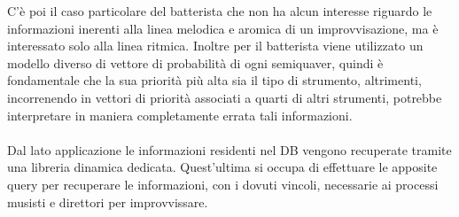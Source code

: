 C'è poi il caso particolare del batterista
che non ha alcun interesse riguardo le informazioni inerenti alla linea melodica 
e aromica di un improvvisazione, ma è interessato solo alla linea ritmica. Inoltre
per il batterista viene utilizzato un modello diverso di vettore di probabilità 
di ogni semiquaver, quindi è fondamentale che la sua priorità più alta sia il tipo 
di strumento, altrimenti, incorrenendo in vettori di priorità associati a quarti di
altri strumenti, potrebbe interpretare in maniera completamente errata tali informazioni.\\\\
Dal lato applicazione le informazioni residenti nel DB vengono recuperate tramite
una libreria dinamica dedicata. Quest'ultima si occupa di effettuare le apposite
query per recuperare le informazioni, con i dovuti vincoli, necessarie ai processi 
musisti e direttori per improvvissare.

